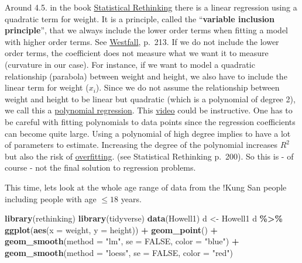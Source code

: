 \documentclass[
]{book}
\newenvironment{Shaded}{\begin{snugshade}}{\end{snugshade}}
\newcommand{\AttributeTok}[1]{\textcolor[rgb]{0.13,0.29,0.53}{#1}}
\newcommand{\ConstantTok}[1]{\textcolor[rgb]{0.56,0.35,0.01}{#1}}
\newcommand{\FunctionTok}[1]{\textcolor[rgb]{0.13,0.29,0.53}{\textbf{#1}}}
\newcommand{\NormalTok}[1]{#1}
\newcommand{\OtherTok}[1]{\textcolor[rgb]{0.56,0.35,0.01}{#1}}
\newcommand{\SpecialCharTok}[1]{\textcolor[rgb]{0.81,0.36,0.00}{\textbf{#1}}}
\newcommand{\StringTok}[1]{\textcolor[rgb]{0.31,0.60,0.02}{#1}}
\begin{document}
Around 4.5. in the book \href{https://civil.colorado.edu/~balajir/CVEN6833/bayes-resources/RM-StatRethink-Bayes.pdf}{Statistical Rethinking}
there is a linear regression using a quadratic term for weight.
It is a principle, called the ``\textbf{variable inclusion principle}'', that we always include the lower order terms when fitting a model
with higher order terms. See \href{https://vdoc.pub/documents/understanding-regression-analysis-a-conditional-distribution-approach-84oqjr8sqva0}{Westfall},
p.~213. If we do not include the lower order terms, the coefficient does not measure what
we want it to measure (curvature in our case). For instance, if we want to model a quadratic relationship (parabola) between
weight and height, we also have to include the linear term for weight (\(x_i\)).
Since we do not assume the relationship between weight and height to be linear but
quadratic (which is a polynomial of degree 2), we call this a
\href{https://en.wikipedia.org/wiki/Polynomial_regression\#:~:text=In\%20statistics\%2C\%20polynomial\%20regression\%20is,nth\%20degree\%20polynomial\%20in\%20x.}{polynomial regression}.
This \href{https://www.youtube.com/watch?v=QptI-vDle8Y&ab_channel=MikeXCohen}{video} could be instructive.
One has to be careful with fitting polynomials to data points since the regression coefficients
can become quite large. Using a polynomial of high degree implies to have a lot of parameters
to estimate. Increasing the degree of the polynomial increases \(R^2\) but also the risk of
\href{https://www.mathworks.com/discovery/overfitting.html}{overfitting}.
(see Statistical Rethinking p.~200). So this is - of course - not the final solution to regression problems.

This time, lets look at the whole age range of data from the !Kung San people
including people with age \(\le 18\) years.

\begin{Shaded}
\begin{Highlighting}[]
\FunctionTok{library}\NormalTok{(rethinking)}
\FunctionTok{library}\NormalTok{(tidyverse)}
\FunctionTok{data}\NormalTok{(Howell1)}
\NormalTok{d }\OtherTok{\textless{}{-}}\NormalTok{ Howell1}
\NormalTok{d }\SpecialCharTok{\%\textgreater{}\%} \FunctionTok{ggplot}\NormalTok{(}\FunctionTok{aes}\NormalTok{(}\AttributeTok{x =}\NormalTok{ weight, }\AttributeTok{y =}\NormalTok{ height)) }\SpecialCharTok{+}
  \FunctionTok{geom\_point}\NormalTok{() }\SpecialCharTok{+}
  \FunctionTok{geom\_smooth}\NormalTok{(}\AttributeTok{method =} \StringTok{"lm"}\NormalTok{, }\AttributeTok{se =} \ConstantTok{FALSE}\NormalTok{, }\AttributeTok{color =} \StringTok{"blue"}\NormalTok{) }\SpecialCharTok{+}
  \FunctionTok{geom\_smooth}\NormalTok{(}\AttributeTok{method =} \StringTok{"loess"}\NormalTok{, }\AttributeTok{se =} \ConstantTok{FALSE}\NormalTok{, }\AttributeTok{color =} \StringTok{"red"}\NormalTok{)}
\end{Highlighting}
\end{Shaded}
\end{document}
